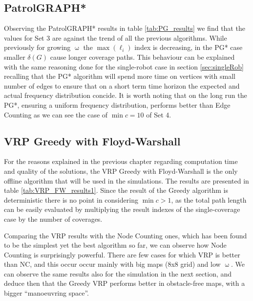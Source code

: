 




\subsection{PatrolGRAPH*}

Observing the PatrolGRAPH* results in table \ref{tab:PG_results} we find that the values for Set 3 are against the trend of all the previous algorithms. While previously for growing $\upomega$ the $\max(\ell_i)$ index is decreasing, in the PG* case smaller $\delta(G)$ cause longer coverage paths. This behaviour can be explained with the same reasoning done for the single-robot case in section \ref{sec:singleRob} recalling that the PG* algorithm will spend more time on vertices with small number of edges to ensure that on a short term time horizon the expected and actual frequency distribution concide. It is worth noting that on the long run the PG*, ensuring a uniform frequency distribution, performs better than Edge Counting as we can see the case of $\min c=10$ of Set 4.



\subsection{VRP Greedy with Floyd-Warshall}

For the reasons explained in the previous chapter regarding computation time and quality of the solutions, the VRP Greedy with Floyd-Warshall is the only offline algorithm that will be used in the simulations. The results are presented in table \ref{tab:VRP_FW_results1}. Since the result of the Greedy algorithm is deterministic there is no point in considering $\min c>1$, as the total path length can be easily evaluated by multiplying the result indexes of the single-coverage case by the number of coverages.



Comparing the VRP results with the Node Counting ones, which has been found to be the simplest yet the best algorithm so far, we can observe how Node Counting is surprisingly powerful. There are few cases for which VRP is better than NC, and this occur occur mainly with big maps (8x8 grid) and low $\upomega$. We can observe the same results also for the simulation in the next section, and deduce then that the Greedy VRP performs better in obstacle-free maps, with a bigger ``manoeuvring space''.

